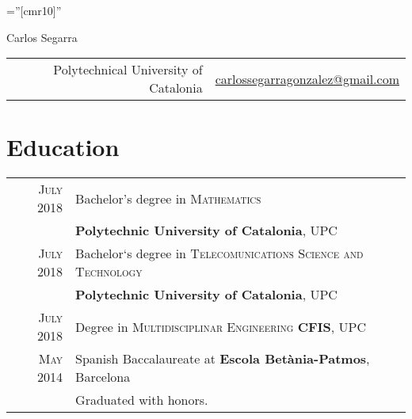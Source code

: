 \documentclass[a4paper,10pt]{article} %
\begin{document}
\pagestyle{empty} %

\font\fb=''[cmr10]'' %



\vspace{-20pt}

\begin{center}
\begin{huge}
Carlos Segarra
\end{huge}

\begin{tabular}{rl}
Polytechnical University of Catalonia  & \href{mailto:carlossegarragonzalez@gmail.com}{carlossegarragonzalez@gmail.com}
\end{tabular}
\end{center}


\section{Education}

\begin{tabular}{rl}	
\textsc{July} 2018 & Bachelor's degree in \textsc{Mathematics} \\ & \textbf{Polytechnic University of Catalonia}, UPC\\


\textsc{July} 2018 &  Bachelor`s degree in \textsc{Telecomunications Science and Technology}\\ & \textbf{Polytechnic University of Catalonia}, UPC\\

\textsc{July} 2018 &  Degree in \textsc{Multidisciplinar Engineering} \textbf{CFIS}, UPC\\


\textsc{May} 2014 & Spanish Baccalaureate at \textbf{Escola Betània-Patmos}, Barcelona \\ &  Graduated with honors. \\
\end{tabular}
\end{document}
